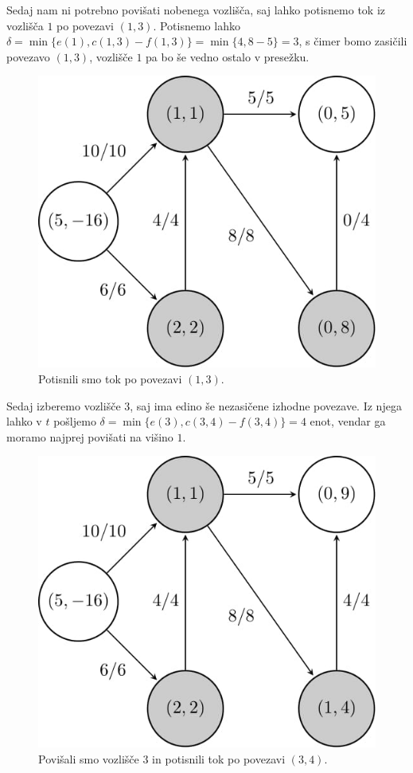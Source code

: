 \documentclass[mat1]{fmfdelo}
\begin{document}
Sedaj nam ni potrebno povišati nobenega vozlišča, saj lahko potisnemo tok iz vozlišča $1$ po povezavi $(1,3)$. Potisnemo lahko
$\delta = \min \{e(1), c(1,3) - f(1,3)\} = \min \{4, 8-5\} = 3$, s čimer bomo zasičili povezavo $(1,3)$, vozlišče $1$ pa bo še vedno
ostalo v presežku.

\begin{figure}[H]
  \centering
  \includegraphics[scale=.358]{images/graf2-5/graf2-5-1.jpg}
  \caption{Potisnili smo tok po povezavi $(1,3)$.}
\end{figure}

Sedaj izberemo vozlišče $3$, saj ima edino še nezasičene izhodne povezave. Iz njega lahko v $t$ pošljemo $\delta = \min\{e(3), c(3,4) - f(3,4)\} = 4$ enot,
vendar ga moramo najprej povišati na višino $1$.

\begin{figure}[H]
  \centering
  \includegraphics[scale=.358]{images/graf2-6/graf2-6-1.jpg}
  \caption{Povišali smo vozlišče $3$ in potisnili tok po povezavi $(3,4)$.}
\end{figure}
\end{document}
